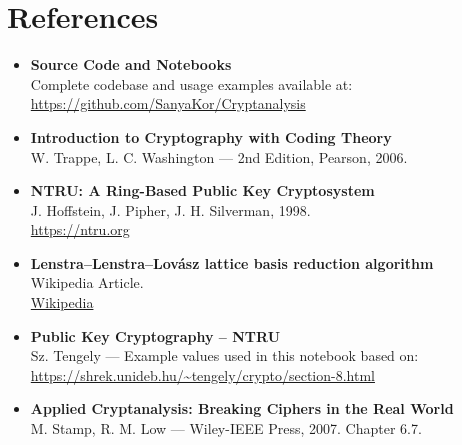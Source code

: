 \documentclass[a4paper,12pt]{article}
\begin{document}
\newpage
\section{References}
\vspace{0.5em}
\begin{itemize}
    \item \textbf{Source Code and Notebooks} \\
    Complete codebase and usage examples available at: \\
    \url{https://github.com/SanyaKor/Cryptanalysis}
    \item \textbf{Introduction to Cryptography with Coding Theory} \\
    W. Trappe, L. C. Washington — 2nd Edition, Pearson, 2006.

    \item \textbf{NTRU: A Ring-Based Public Key Cryptosystem} \\
    J. Hoffstein, J. Pipher, J. H. Silverman, 1998. \\
    \url{https://ntru.org}

    \item \textbf{Lenstra--Lenstra--Lovász lattice basis reduction algorithm} \\
    Wikipedia Article. \\
\href{https://en.wikipedia.org/wiki/Lenstra%E2%80%93Lenstra%E2%80%93Lov%C3%A1sz_lattice_basis_reduction_algorithm}{Wikipedia}

    \item \textbf{Public Key Cryptography – NTRU} \\
    Sz. Tengely — Example values used in this notebook based on: \\
    \url{https://shrek.unideb.hu/~tengely/crypto/section-8.html}

    \item \textbf{Applied Cryptanalysis: Breaking Ciphers in the Real World} \\
    M. Stamp, R. M. Low — Wiley-IEEE Press, 2007. Chapter 6.7.
\end{itemize}
\end{document}
